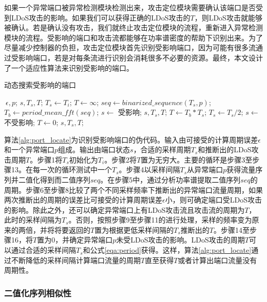 如果一个异常端口被异常检测模块检测出来，攻击定位模块需要确认该端口是否受到LDoS攻击的影响。如果我们可以获得正确的LDoS攻击的$T$，则LDoS攻击就能够被确认。若是确认没有攻击，我们就终止攻击定位模块的流程，重新进入异常检测模块的流程。受影响的端口和攻击流都能够在功率谱密度的帮助下识别出来。为了尽量减少控制器的负担，攻击定位模块首先识别受影响端口，因为可能有很多流通过受影响端口，若是对每条流进行识别会消耗很多不必要的资源。最终，本文设计了一个适应性算法来识别受影响的端口。

\begin{algorithm}[H]
	\caption{动态搜索受影响的端口}
	\label{alg:port_locate}
	\begin{algorithmic}[1]
		\Require $~{\epsilon}, p$;
		\Ensure $s, T_s, T$;
		\State $T_s \gets T_i$;
		\State $T \gets \infty$; 
		\State $seq \gets binarized\_sequence(T_s, p)$;
		\State $T_b \gets period\_mean\_fft(seq)$;
		\State $s \gets$ 受影响;
		\State \Return $s, T_s, T$;
		\Else
		\State $T \gets T_b * T_s$;
		\State $T_s \gets T_s / 2$;
		\EndIf 
		\EndWhile
		\State $s \gets$ 不受影响;
		\State $T \gets 0$; 
		\State \Return $s, T_s, T$;
	\end{algorithmic}
\end{algorithm}

算法\ref{alg:port_locate}为识别受影响端口的伪代码。输入由可接受的计算周期误差$\epsilon$和一个异常端口$p$组成。输出由端口状态$s$，合适的采样周期$T_s$和推断出的LDoS攻击周期$T$。步骤1将$T_s$初始化为$T_i$。步骤2将$T$置为无穷大。主要的循环是步骤3至步骤13。在每一次的循环测试中一个$T_s$。步骤4以采样间隔$T_s$从异常端口$p$获得流量序列并二值化得到而二值序列$seq$。在步骤5中，通过分析功率谱提取二值序列$seq$的周期。步骤6至步骤8比较了两个不同采样频率下推断出的异常端口流量周期，如果两次推断出的周期的误差比可接受的计算周期误差$\epsilon$小，则可确定端口受LDoS攻击的影响。除此之外，还可以确定异常端口上有LDoS攻击流且攻击流的周期为$T$，此时的采样间隔为$T_s$。否则，按照步骤9至步骤11的进行处理，采样的频率变为原来的两倍，并将将要返回的$T$置为根据更低采样间隔的$T_s$推断出的$T$。步骤14至步骤16，将$T$置为0，并确定异常端口$p$未受LDoS攻击的影响。LDoS攻击的周期$T$可以通过合适的采样间隔$T_s$和公式\ref{eqa:period}获得。这样，算法\ref{alg:port_locate}通过不断降低的采样间隔计算端口流量的周期$T$直至获得$T$或者计算出端口流量没有周期性。

\subsubsection{二值化序列相似性}
\label{chap4:seq-similarity}

